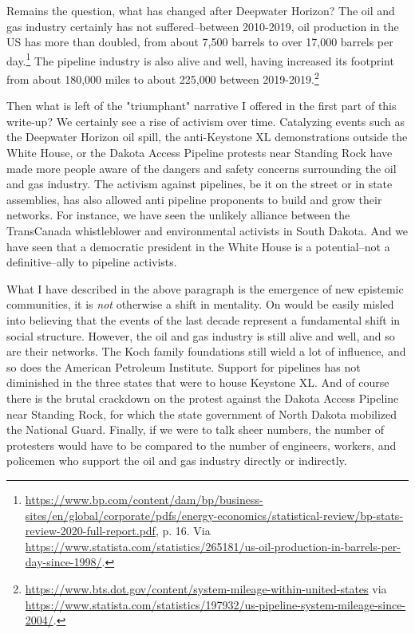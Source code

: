 \documentclass{article}
\begin{document}
	Remains the question, what has changed after Deepwater Horizon? The oil and gas industry certainly has not suffered--between 2010-2019, oil production in the US has more than doubled, from about 7,500 barrels to over 17,000 barrels per day.\footnote{\url{https://www.bp.com/content/dam/bp/business-sites/en/global/corporate/pdfs/energy-economics/statistical-review/bp-stats-review-2020-full-report.pdf}, p. 16. Via \url{https://www.statista.com/statistics/265181/us-oil-production-in-barrels-per-day-since-1998/}.} The pipeline industry is also alive and well, having increased its footprint from about 180,000 miles to about 225,000 between 2019-2019.\footnote{\url{https://www.bts.dot.gov/content/system-mileage-within-united-states} via \url{https://www.statista.com/statistics/197932/us-pipeline-system-mileage-since-2004/}.}

	Then what is left of the "triumphant" narrative I offered in the first part of this write-up? We certainly see a rise of activism over time. Catalyzing events such as the Deepwater Horizon oil spill, the anti-Keystone XL demonstrations outside the White House, or the Dakota Access Pipeline protests near Standing Rock have made more people aware of the dangers and safety concerns surrounding the oil and gas industry. The activism against pipelines, be it on the street or in state assemblies, has also allowed anti pipeline proponents to build and grow their networks. For instance, we have seen the unlikely alliance between the TransCanada whistleblower and environmental activists in South Dakota. And we have seen that a democratic president in the White House is a potential--not a definitive--ally to pipeline activists.

	What I have described in the above paragraph is the emergence of new epistemic communities, it is \textit{not} otherwise a shift in mentality. On would be easily misled into believing that the events of the last decade represent a fundamental shift in social structure. However, the oil and gas industry is still alive and well, and so are their networks. The Koch family foundations still wield a lot of influence, and so does the American Petroleum Institute. Support for pipelines has not diminished in the three states that were to house Keystone XL. And of course there is the brutal crackdown on the protest against the Dakota Access Pipeline near Standing Rock, for which the state government of North Dakota mobilized the National Guard. Finally, if we were to talk sheer numbers, the number of protesters would have to be compared to the number of engineers, workers, and policemen who support the oil and gas industry directly or indirectly.
\end{document}
